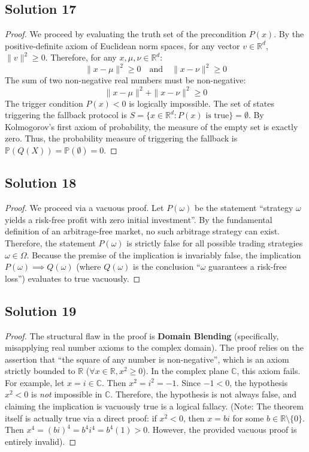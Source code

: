 \documentclass[12pt]{article}
\begin{document}
\subsection*{Solution 17}
\begin{proof}
We proceed by evaluating the truth set of the precondition $P(x)$. By the positive-definite axiom of Euclidean norm spaces, for any vector $v \in \mathbb{R}^d$, $\|v\|^2 \ge 0$. Therefore, for any $x, \mu, \nu \in \mathbb{R}^d$:
\[ \|x - \mu\|^2 \ge 0 \quad \text{and} \quad \|x - \nu\|^2 \ge 0 \]
The sum of two non-negative real numbers must be non-negative:
\[ \|x - \mu\|^2 + \|x - \nu\|^2 \ge 0 \]
The trigger condition $P(x) < 0$ is logically impossible. The set of states triggering the fallback protocol is $S = \{x \in \mathbb{R}^d : P(x) \text{ is true}\} = \emptyset$. By Kolmogorov's first axiom of probability, the measure of the empty set is exactly zero. Thus, the probability measure of triggering the fallback is $\mathbb{P}(Q(X)) = \mathbb{P}(\emptyset) = 0$.
\end{proof}

\subsection*{Solution 18}
\begin{proof}
We proceed via a vacuous proof. Let $P(\omega)$ be the statement ``strategy $\omega$ yields a risk-free profit with zero initial investment''. By the fundamental definition of an arbitrage-free market, no such arbitrage strategy can exist. Therefore, the statement $P(\omega)$ is strictly false for all possible trading strategies $\omega \in \Omega$. Because the premise of the implication is invariably false, the implication $P(\omega) \implies Q(\omega)$ (where $Q(\omega)$ is the conclusion ``$\omega$ guarantees a risk-free loss'') evaluates to true vacuously.
\end{proof}

\subsection*{Solution 19}
\begin{proof}
The structural flaw in the proof is \textbf{Domain Blending} (specifically, misapplying real number axioms to the complex domain). The proof relies on the assertion that ``the square of any number is non-negative'', which is an axiom strictly bounded to $\mathbb{R}$ ($\forall x \in \mathbb{R}, x^2 \ge 0$). 
In the complex plane $\mathbb{C}$, this axiom fails. For example, let $x = i \in \mathbb{C}$. Then $x^2 = i^2 = -1$. Since $-1 < 0$, the hypothesis $x^2 < 0$ is \textit{not} impossible in $\mathbb{C}$. Therefore, the hypothesis is not always false, and claiming the implication is vacuously true is a logical fallacy. 
(Note: The theorem itself is actually true via a direct proof: if $x^2 < 0$, then $x = bi$ for some $b \in \mathbb{R} \setminus \{0\}$. Then $x^4 = (bi)^4 = b^4 i^4 = b^4(1) > 0$. However, the provided vacuous proof is entirely invalid).
\end{proof}
\end{document}
